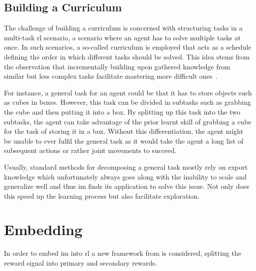 \documentclass[draft,final]{vutinfth} %
\begin{document}
    \subsection{Building a Curriculum}
    The challenge of building a curriculum is concerned with structuring tasks in a multi-task \gls{rl} scenario, a scenario where an agent has to solve multiple tasks at once.
    In such scenarios, a so-called curriculum is employed that acts as a schedule defining the order in which different tasks should be solved.
    This idea stems from the observation that incrementally building upon gathered knowledge from similar but less complex tasks facilitate mastering more difficult ones~\citep{aubret_survey_2019}.

    For instance, a general task for an agent could be that it has to store objects such as cubes in boxes.
    However, this task can be divided in subtasks such as grabbing the cube and then putting it into a box.
    By splitting up this task into the two subtasks, the agent can take advantage of the prior learnt skill of grabbing a cube for the task of storing it in a box.
    Without this differentiation, the agent might be unable to ever fulfil the general task as it would take the agent a long list of subsequent actions or rather joint movements to succeed.

    Usually, standard methods for decomposing a general task mostly rely on export knowledge which unfortunately always goes along with the inability to scale and generalize well and thus \gls{im} finds its application to solve this issue.
    Not only does this speed up the learning process but also facilitate exploration.


    \section{Embedding}

    In order to embed \gls{im} into \gls{rl} a new framework from \citeauthor{singh_intrinsically_2010} is considered, splitting the reward signal into primary and secondary rewards.
\end{document}

